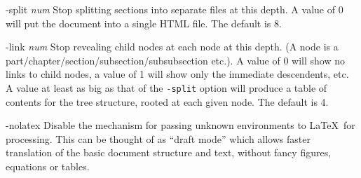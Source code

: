\documentclass[dvips]{article}
\begin{document}
\begin{htmllist}
\label{listExample}
\item [-split \textsl{num}]
Stop splitting sections into separate files at this depth.
A value of 0 will put the document into a 
single HTML
file. The default is 8.
\item [-link \textsl{num}]
Stop revealing child nodes at each node at this depth. 
(A node is a part/chapter/section/subsection/subsubsection etc.).
A value of 0 will show no links to child nodes, a value of 1 
will show only the immediate descendents, etc. A value
at least as big as that of the \texttt{-split}
option will produce a table of contents for
the tree structure, rooted at each given node. The default is 4.
\label{page:nolatex}
\item [-nolatex ]
Disable the mechanism for passing unknown environments to \LaTeX\ for processing.
This can be thought of as ``draft mode'' which allows  faster translation of the 
basic document structure and text, without fancy figures, equations or
tables. 


\end{htmllist}
\end{document}
